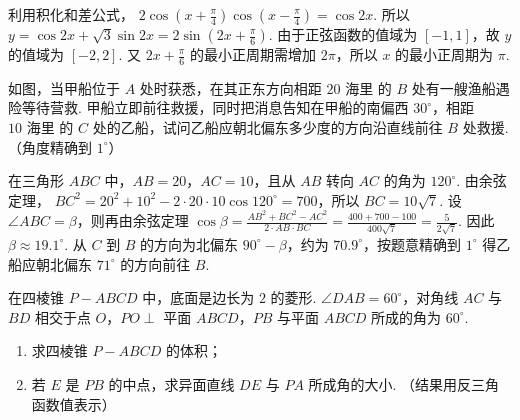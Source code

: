 \begin{solution}
利用积化和差公式，
\(2\cos\left(x+\frac{\pi}{4}\right)\cos\left(x-\frac{\pi}{4}\right)=\cos2x\). 所以
\(y=\cos2x+\sqrt{3}\sin2x=2\sin\left(2x+\frac{\pi}{6}\right)\). 由于正弦函数的值域为 \([-1,1]\)，故 \(y\) 的值域为 \([-2,2]\). 又 \(2x+\frac{\pi}{6}\) 的最小正周期需增加 \(2\pi\)，所以 \(x\) 的最小正周期为 \(\pi\).
\end{solution}

\begin{problem}
如图，当甲船位于 \(A\) 处时获悉，在其正东方向相距 \(20\text{ 海里}\) 的 \(B\) 处有一艘渔船遇险等待营救. 甲船立即前往救援，同时把消息告知在甲船的南偏西 \(30^{\circ}\)，相距 \(10\text{ 海里}\) 的 \(C\) 处的乙船，试问乙船应朝北偏东多少度的方向沿直线前往 \(B\) 处救援. （角度精确到 \(1^{\circ}\)）

\end{problem}

\begin{solution}
在三角形 \(ABC\) 中，\(AB=20\)，\(AC=10\)，且从 \(AB\) 转向 \(AC\) 的角为 \(120^{\circ}\). 由余弦定理，
\(BC^2=20^2+10^2-2\cdot20\cdot10\cos120^{\circ}=700\)，所以 \(BC=10\sqrt{7}\). 设 \(\angle ABC=\beta\)，则再由余弦定理
\(\displaystyle \cos\beta=\frac{AB^2+BC^2-AC^2}{2\cdot AB\cdot BC}=\frac{400+700-100}{400\sqrt{7}}=\frac{5}{2\sqrt{7}}\). 因此 \(\beta\approx19.1^{\circ}\). 从 \(C\) 到 \(B\) 的方向为北偏东 \(90^{\circ}-\beta\)，约为 \(70.9^{\circ}\)，按题意精确到 \(1^{\circ}\) 得乙船应朝北偏东 \(71^{\circ}\) 的方向前往 \(B\).
\end{solution}

\begin{problem}
在四棱锥 \(P - ABCD\) 中，底面是边长为 \(2\) 的菱形. \(\angle DAB = 60^{\circ}\)，对角线 \(AC\) 与 \(BD\) 相交于点 \(O\)，\(PO \perp\) 平面 \(ABCD\)，\(PB\) 与平面 \(ABCD\) 所成的角为 \(60^{\circ}\).

\begin{enumerate}
\item 求四棱锥 \(P-ABCD\) 的体积；
\item 若 \(E\) 是 \(PB\) 的中点，求异面直线 \(DE\) 与 \(PA\) 所成角的大小. （结果用反三角函数值表示）
\end{enumerate}

\end{problem}

